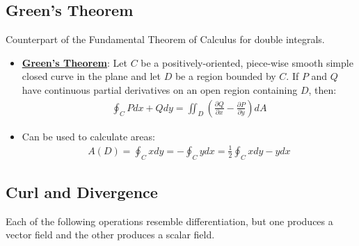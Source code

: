 \documentclass[11pt]{article}
\newcommand{\dfn}[1]{\underline{\textbf{#1}}}
\begin{document}
\subsection{Green's Theorem}
Counterpart of the Fundamental Theorem of Calculus for double integrals.
\begin{itemize}[noitemsep]
	\item \dfn{Green's Theorem}: Let $C$ be a positively-oriented, piece-wise smooth simple closed curve in the plane and let $D$ be a region bounded by $C$. If $P$ and $Q$ have continuous partial derivatives on an open region containing $D$, then:
	\begin{align}
		\oint_C Pdx + Qdy = \iint_D \left( \frac{\partial Q}{\partial x} - \frac{\partial P}{\partial y} \right) dA 	
	\end{align}
	\item Can be used to calculate areas: 
	\begin{align}
		A(D) = \oint_C x dy = - \oint_C y dx = \frac{1}{2} \oint_C x dy - y dx 	
	\end{align}
\end{itemize}

\subsection{Curl and Divergence}
Each of the following operations resemble differentiation, but one produces a vector field and the other produces a scalar field. 
\end{document}
